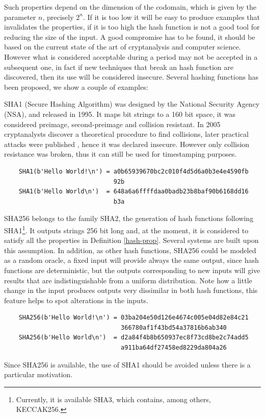 Such properties depend on the dimension of the codomain, which is given by the parameter $n$, precisely $2^n$. If it is too low it will be easy to produce examples that invalidates the properties, if it is too high the hash function is not a good tool for reducing the size of the input. A good compromise has to be found, it should be based on the current state of the art of cryptanalysis and computer science. However what is considered acceptable during a period may not be accepted in a subsequent one, in fact if new techniques that break an hash function are discovered, then its use will be considered insecure.
Several hashing functions has been proposed, we show a couple of examples:
\begin{myexample}
	SHA1 (Secure Hashing Algorithm) was designed by the National Security Agency (NSA), and released in 1995. It maps bit strings to a 160 bit space, it was considered preimage, second-preimage and collision resistant. In 2005 cryptanalysts discover a theoretical procedure to find collisions, later practical attacks were published \cite{cryptoeprint:2017:190}, hence it was declared insecure. However only collision resistance was broken, thus it can still be used for timestamping purposes.
	\begin{verbatim}
	SHA1(b'Hello World!\n') = a0b65939670bc2c010f4d5d6a0b3e4e4590fb
	                          92b
	SHA1(b'Hello World\n')  = 648a6a6ffffdaa0badb23b8baf90b6168dd16
	                          b3a
	\end{verbatim}
\end{myexample}

\begin{myexample}
	SHA256 belongs to the family SHA2, the generation of hash functions following SHA1\footnote{Currently, it is available SHA3, which contains, among others, KECCAK256.}. It outputs  strings 256 bit long and, at the moment, it is considered to satisfy all the properties in Definition \ref{hash-prop}.
	Several systems are built upon this assumption. 
	In addition, as other hash functions, SHA256 could be modeled as a random oracle, a fixed input will provide always the same output, since hash functions are deterministic, but the outputs corresponding to new inputs will give results that are indistinguishable from a uniform distribution. 
	Note how a little change in the input produces outputs very dissimilar in both hash functions, this feature helps to spot alterations in the inputs.
	\begin{verbatim}
	SHA256(b'Hello World!\n') = 03ba204e50d126e4674c005e04d82e84c21
	                            366780af1f43bd54a37816b6ab340
	SHA256(b'Hello World\n')  = d2a84f4b8b650937ec8f73cd8be2c74add5
	                            a911ba64df27458ed8229da804a26
	\end{verbatim}
	Since SHA256 is available, the use of SHA1 should be avoided unless there is a particular motivation. 
\end{myexample}

